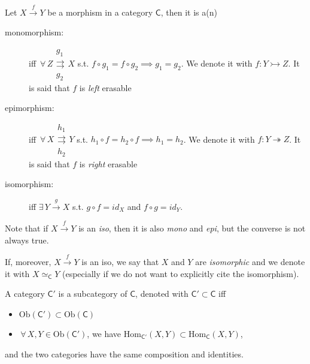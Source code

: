 \begin{defn}
	Let $X \xrightarrow{f} Y$ be a morphism in a category $\mathsf{C}$, then it is a(n)
	\begin{description}
		\item[monomorphism:] iff $\,\forall\, Z \begin{matrix} g_1 \\ \rightrightarrows \\ g_2 \end{matrix} X$ s.t. $f \circ g_1 = f \circ g_2 \implies g_1 = g_2$.
			We denote it with $f\colon Y \rightarrowtail Z$.
			It is said that $f$ is {\em left} erasable
		\item[epimorphism:] iff $\,\forall\, X \begin{matrix} h_1 \\ \rightrightarrows \\ h_2 \end{matrix} Y$ s.t. $h_1 \circ f = h_2 \circ f \implies h_1 = h_2$.
			We denote it with $f\colon Y \twoheadrightarrow Z$.
			It is said that $f$ is {\em right} erasable
		\item[isomorphism:] iff $\exists\,  Y \xrightarrow{g} X$ s.t. $g \circ f = id_X$ and $f \circ g = id_Y$.
	\end{description} 	
\end{defn}

\begin{rem}
	Note that if $X \xrightarrow{f} Y$ is an {\em iso}, then it is also {\em mono} and {\em epi}, but the converse is not always true.

	If, moreover, $X \xrightarrow{f} Y$ is an iso, we say that $X$ and $Y$ are {\em isomorphic} and we denote it with $X \simeq_{\mathsf{C}} Y$ (especially if we do not want to explicitly cite the isomorphism).
\end{rem}

\begin{defn}[Subcategory]
	A category $\mathsf{C}'$ is a subcategory of $\mathsf{C}$, denoted with $\mathsf{C}' \subset \mathsf{C}$ iff
	\begin{itemize}
		\item $\mathrm{Ob}(\mathsf{C}') \subset \mathrm{Ob}(\mathsf{C})$
		\item $\,\forall\, X,Y \in \mathrm{Ob}(\mathsf{C}')$, we have $\mathrm{Hom}_{\mathsf{C}'} \left( X, Y \right) \subset \mathrm{Hom}_{\mathsf{C}} \left( X, Y \right)$,
	\end{itemize} 
	and the two categories have the same composition and identities.
\end{defn}

